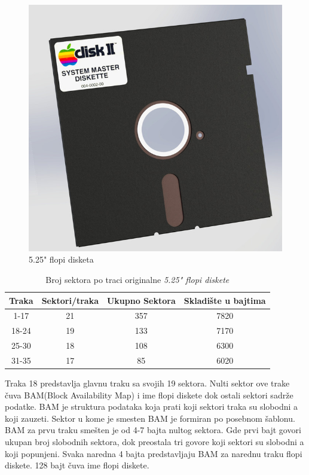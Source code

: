 \begin{figure}[ht]
\begin{center}
\includegraphics[width=13cm]{img/Flopi.jpg}
\caption[5.25" flopi disketa \textit{(preuzeto \cite{Flopi})}]{5.25" flopi disketa}
\label{img:flopi}
\end{center}
\end{figure}

\begin{table}[h!]
\begin{center}
\begin{tabular}{ | c | c| c | c | } 
\hline
Traka & Sektori/traka & Ukupno Sektora & Skladište u bajtima \\
\hline
\hline
1-17 & 21 & 357 & 7820 \\
\hline
18-24 & 19 & 133 & 7170 \\
\hline
25-30 & 18 & 108 & 6300 \\
\hline
31-35 & 17 & 85 & 6020 \\
\hline
\end{tabular}
\end{center}
\caption{Broj sektora po traci originalne \textit{5.25" flopi diskete}}
\label{tab:sektor_traka}
\end{table}

Traka 18 predstavlja glavnu traku sa svojih 19 sektora. Nulti sektor ove trake čuva BAM(Block Availability Map) i ime flopi diskete dok ostali sektori sadrže podatke. BAM je struktura podataka koja prati koji sektori traka su slobodni a koji zauzeti. Sektor u kome je smesten BAM je formiran po posebnom šablonu. BAM za prvu traku smešten je od 4-7 bajta nultog sektora. Gde prvi bajt govori ukupan broj slobodnih sektora, dok preostala tri govore koji sektori su slobodni a koji popunjeni. Svaka naredna 4 bajta predstavljaju BAM za narednu traku flopi diskete. 128 bajt čuva ime flopi diskete.

